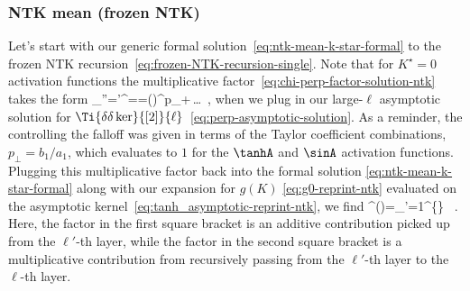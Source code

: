 \subsubsection{NTK mean (frozen NTK)}
Let's start with our generic formal solution~\eqref{eq:ntk-mean-k-star-formal} to the frozen NTK recursion~\eqref{eq:frozen-NTK-recursion-single}. Note that for $K^\star=0$ activation functions the  multiplicative factor~\eqref{eq:chi-perp-factor-solution-ntk} takes the form
\be\label{eq:chi-perp-factor-solution-ntk-specific}
\prod_{\ell''=\ell'}^{}==\le(\ri)^{p_{\perp}}\!+\,\ldots\, ,
\ee
when we plug in our large-$\ell$ asymptotic solution for 
$\Ti{\delta\delta\ker}{[2]}{\ell}$~\eqref{eq:perp-asymptotic-solution}. As a reminder, the  controlling the falloff was given in terms of the Taylor coefficient combinations,  $p_{\perp}=b_1/a_1$, which evaluates to $1$ for the $\tanhA$ and $\sinA$ activation functions.
Plugging this multiplicative factor back into the formal solution 
\eqref{eq:ntk-mean-k-star-formal} along with our expansion for $g(K)$ \eqref{eq:g0-reprint-ntk} evaluated on the asymptotic kernel~\eqref{eq:tanh_asymptotic-reprint-ntk}, we find
\be\label{eq:ntk-mean-k-star-formal-2}
\NTKI^{(\ell)}=\sum_{\ell'=1}^{\ell}\le\{ \ri\} \, .
\ee
Here, 
the factor in the first square bracket is an additive contribution picked up from the $\ell'$-th layer, while the factor in the second square bracket is a multiplicative contribution from recursively passing from the $\ell'$-th layer to the $\ell$-th layer. 





